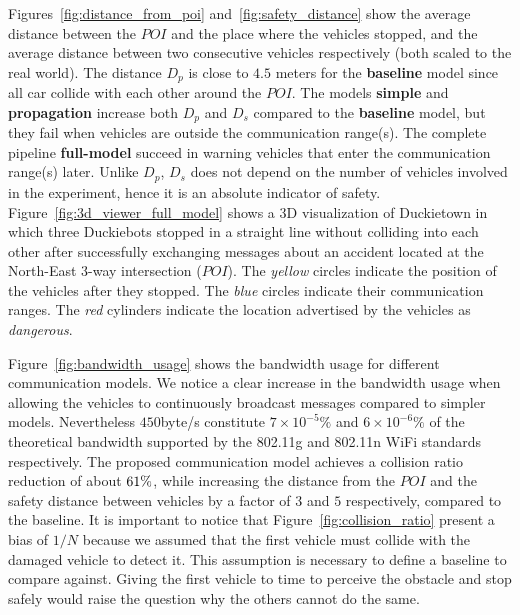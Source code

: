 Figures~\ref{fig:distance_from_poi} and~\ref{fig:safety_distance} show the average distance 
between the $POI$ and the place where the vehicles stopped, and the average distance 
between two consecutive vehicles respectively (both scaled to the real world).
The distance $D_p$ is close to $4.5$ meters for the \textbf{baseline} model since all car collide with each 
other around the $POI$. The models \textbf{simple} and \textbf{propagation} increase both 
$D_p$ and $D_s$ compared to the \textbf{baseline} model, but they fail when vehicles are outside the communication range(s).
The complete pipeline \textbf{full-model} succeed in warning vehicles that enter the communication range(s) later.
Unlike $D_p$, $D_s$ does not depend on the number of vehicles involved in the experiment, hence it 
is an absolute indicator of safety. Figure~\ref{fig:3d_viewer_full_model} shows a 3D visualization of Duckietown
in which three Duckiebots stopped in a straight line without colliding into each other
after successfully exchanging messages about an accident located at the North-East 3-way intersection ($POI$).
The \textit{yellow} circles indicate the position of the vehicles after they stopped. 
The \textit{blue} circles indicate their communication ranges. The \textit{red} cylinders 
indicate the location advertised by the vehicles as \textit{dangerous}.

Figure~\ref{fig:bandwidth_usage} shows the bandwidth usage for different communication models.
We notice a clear increase in the bandwidth usage when allowing the vehicles to continuously broadcast messages
compared to simpler models. Nevertheless $450$byte/s constitute $7 \times 10^{-5}\%$ and
$6 \times 10^{-6}\%$ of the theoretical bandwidth supported by the 802.11g and 802.11n WiFi standards respectively.
The proposed communication model achieves a collision ratio reduction of about $\collision_ratio_reduction_perc\%$,
while increasing the distance from the $POI$ and the safety distance between vehicles by a factor of 
$3$ and $5$ respectively, compared to the baseline.
It is important to notice that Figure~\ref{fig:collision_ratio} present a bias of $1/N$ because we assumed that
the first vehicle must collide with the damaged vehicle to detect it. This assumption is necessary to define a
baseline to compare against. Giving the first vehicle to time to perceive the obstacle and stop safely would 
raise the question why the others cannot do the same.
